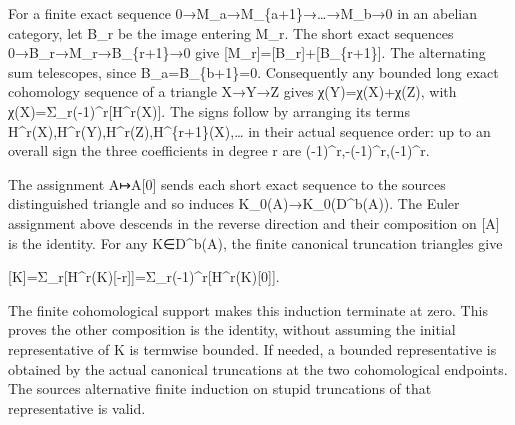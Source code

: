\documentclass[11pt]{article}
\begin{document}
For a finite exact sequence 0\allowbreak{}→M\_\allowbreak{}a\allowbreak{}→M\_\allowbreak{}\{a\allowbreak{}+1\}\allowbreak{}→…\allowbreak{}→M\_\allowbreak{}b\allowbreak{}→0 in an abelian category,\allowbreak{} let B\_\allowbreak{}r be the image entering M\_\allowbreak{}r. The short exact sequences 0\allowbreak{}→B\_\allowbreak{}r\allowbreak{}→M\_\allowbreak{}r\allowbreak{}→B\_\allowbreak{}\{r\allowbreak{}+1\}\allowbreak{}→0 give [M\_\allowbreak{}r]\allowbreak{}\allowbreak{}=[B\_\allowbreak{}r]\allowbreak{}\allowbreak{}+[B\_\allowbreak{}\{r\allowbreak{}+1\}]\allowbreak{}. The alternating sum telescopes,\allowbreak{} since B\_\allowbreak{}a\allowbreak{}=B\_\allowbreak{}\{b\allowbreak{}+1\}\allowbreak{}=0. Consequently any bounded long exact cohomology sequence of a triangle X\allowbreak{}→Y\allowbreak{}→Z gives χ(Y)\allowbreak{}\allowbreak{}=χ(X)\allowbreak{}\allowbreak{}+χ(Z)\allowbreak{},\allowbreak{} with χ(X)\allowbreak{}\allowbreak{}=Σ\_\allowbreak{}r(-1)\allowbreak{}\textasciicircum{}r[H\textasciicircum{}r(X)\allowbreak{}]\allowbreak{}. The signs follow by arranging its terms H\textasciicircum{}r(X)\allowbreak{},\allowbreak{}H\textasciicircum{}r(Y)\allowbreak{},\allowbreak{}H\textasciicircum{}r(Z)\allowbreak{},\allowbreak{}H\textasciicircum{}\{r\allowbreak{}+1\}(X)\allowbreak{},\allowbreak{}… in their actual sequence order:\allowbreak{} up to an overall sign the three coefficients in degree r are (-1)\allowbreak{}\textasciicircum{}r,\allowbreak{}-(-1)\allowbreak{}\textasciicircum{}r,\allowbreak{}(-1)\allowbreak{}\textasciicircum{}r.

The assignment A\allowbreak{}↦A[0]\allowbreak{} sends each short exact sequence to the source\textquotesingle s distinguished triangle and so induces K\_\allowbreak{}0(A)\allowbreak{}\allowbreak{}→K\_\allowbreak{}0(D\textasciicircum{}b(A)\allowbreak{})\allowbreak{}. The Euler assignment above descends in the reverse direction and their composition on [A]\allowbreak{} is the identity. For any K\allowbreak{}∈D\textasciicircum{}b(A)\allowbreak{},\allowbreak{} the finite canonical truncation triangles give

[K]\allowbreak{}\allowbreak{}=Σ\_\allowbreak{}r[H\textasciicircum{}r(K)\allowbreak{}[-r]\allowbreak{}]\allowbreak{}\allowbreak{}=Σ\_\allowbreak{}r(-1)\allowbreak{}\textasciicircum{}r[H\textasciicircum{}r(K)\allowbreak{}[0]\allowbreak{}]\allowbreak{}.

The finite cohomological support makes this induction terminate at zero. This proves the other composition is the identity,\allowbreak{} without assuming the initial representative of K is termwise bounded. If needed,\allowbreak{} a bounded representative is obtained by the actual canonical truncations at the two cohomological endpoints. The source\textquotesingle s alternative finite induction on stupid truncations of that representative is valid.
\end{document}
